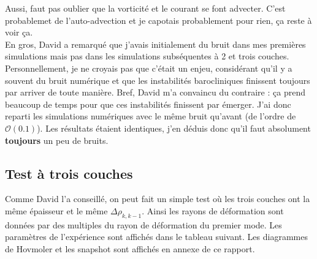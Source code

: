 \documentclass[10pt]{article}
\numberwithin{equation}{section}
\begin{document}
Aussi, faut pas oublier que la vorticité et le courant se font advecter.
C'est probablemet de l'auto-advection et je capotais probablement pour rien, ça reste à voir ça.\\[0pt]

En gros, David a remarqué que j'avais initialement du bruit dans mes premières simulations mais pas dans les simulations subséquentes à 2 et trois couches.
Personnellement, je ne croyais pas que c'était un enjeu, considérant qu'il y a souvent du bruit numérique et que les instabilités barocliniques finissent toujours par arriver de toute manière.
Bref, David m'a convaincu du contraire : ça prend beaucoup de temps pour que ces instabilités finissent par émerger.
J'ai donc reparti les simulations numériques avec le même bruit qu'avant (de l'ordre de \(\mathcal{O}(0.1)\)).
Les résultats étaient identiques, j'en déduis donc qu'il faut absolument \textbf{toujours} un peu de bruits.

\subsection{Test à trois couches}
\label{sec:orgcf6a6e0}
Comme David l'a conseillé, on peut fait un simple test où les trois couches ont la même épaisseur et le même \(\Delta \rho_{k,k-1}\).
Ainsi les rayons de déformation sont données par des multiples du rayon de déformation du premier mode.
Les paramètres de l'expérience sont affichés dans le tableau suivant.
Les diagrammes de Hovmoler et les snapshot sont affichés en annexe de ce rapport.
\end{document}
